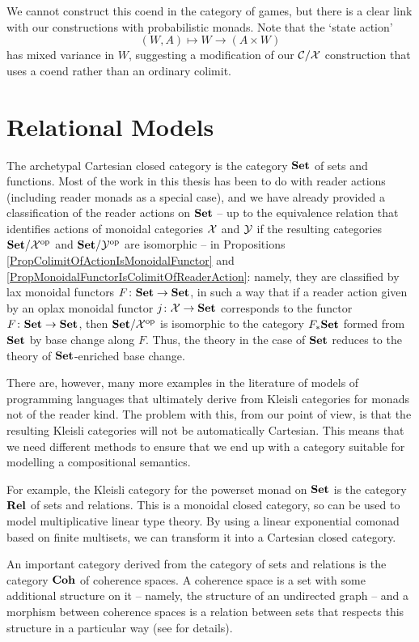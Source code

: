 We cannot construct this coend in the category of games, but there is a clear link with our constructions with probabilistic monads.  
Note that the `state action'
\[
  (W, A) \mapsto W \to (A \times W)
  \]
has mixed variance in $W$, suggesting a modification of our ${\mathcal{C}}/\mathcal X$ construction that uses a coend rather than an ordinary colimit.

\section{Relational Models}

The archetypal Cartesian closed category is the category ${\normalfont\textbf{Set}}$ of sets and functions.  
Most of the work in this thesis has been to do with reader actions (including reader monads as a special case), and we have already provided a classification of the reader actions on ${\normalfont\textbf{Set}}$ -- up to the equivalence relation that identifies actions of monoidal categories $\mathcal X$ and $\mathcal Y$ if the resulting categories ${\normalfont\textbf{Set}}/\mathcal X^{\mathrm{op}}$ and ${\normalfont\textbf{Set}}/\mathcal Y^{\mathrm{op}}$ are isomorphic -- in Propositions \ref{PropColimitOfActionIsMonoidalFunctor} and \ref{PropMonoidalFunctorIsColimitOfReaderAction}: namely, they are classified by lax monoidal functors $F\colon{\normalfont\textbf{Set}} \to {\normalfont\textbf{Set}}$, in such a way that if a reader action given by an oplax monoidal functor $j\colon\mathcal X \to {\normalfont\textbf{Set}}$ corresponds to the functor $F \colon {\normalfont\textbf{Set}} \to {\normalfont\textbf{Set}}$, then ${\normalfont\textbf{Set}}/\mathcal X^{\mathrm{op}}$ is isomorphic to the category $F_*{\normalfont\textbf{Set}}$ formed from ${\normalfont\textbf{Set}}$ by base change along $F$.
Thus, the theory in the case of ${\normalfont\textbf{Set}}$ reduces to the theory of ${\normalfont\textbf{Set}}$-enriched base change.

There are, however, many more examples in the literature of models of programming languages that ultimately derive from Kleisli categories for monads not of the reader kind.  
The problem with this, from our point of view, is that the resulting Kleisli categories will not be automatically Cartesian.  
This means that we need different methods to ensure that we end up with a category suitable for modelling a compositional semantics.

For example, the Kleisli category for the powerset monad on ${\normalfont\textbf{Set}}$ is the category ${\normalfont\textbf{Rel}}$ of sets and relations.  
This is a monoidal closed category, so can be used to model multiplicative linear type theory.
By using a linear exponential comonad based on finite multisets, we can transform it into a Cartesian closed category.

An important category derived from the category of sets and relations is the category ${\normalfont\textbf{Coh}}$ of coherence spaces.  
A coherence space is a set with some additional structure on it -- namely, the structure of an undirected graph -- and a morphism between coherence spaces is a relation between sets that respects this structure in a particular way (see \cite{MelliesCoherence} for details).  


